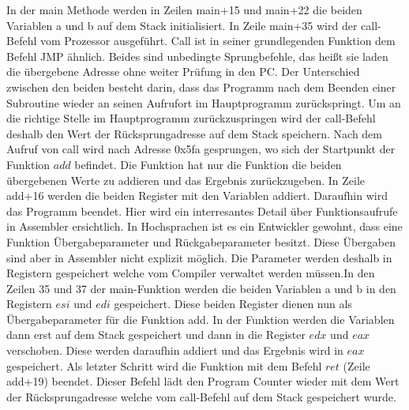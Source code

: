 \documentclass[12pt]{article}
\begin{document}
In der main Methode werden in Zeilen main+15 und main+22 die beiden Variablen a und b auf dem Stack initialisiert. In Zeile main+35 wird der call-Befehl vom Prozessor ausgeführt. Call ist in seiner grundlegenden Funktion dem Befehl JMP ähnlich. Beides sind unbedingte Sprungbefehle, das heißt sie laden die übergebene Adresse ohne weiter Prüfung in den PC. Der Unterschied zwischen den beiden besteht darin, dass das Programm nach dem Beenden einer Subroutine wieder an seinen Aufrufort im Hauptprogramm zurückspringt. Um an die richtige Stelle im Hauptprogramm zurückzuspringen wird der call-Befehl deshalb den Wert der Rücksprungadresse auf dem Stack speichern. Nach dem Aufruf von call wird nach Adresse 0x5fa gesprungen, wo sich der Startpunkt der Funktion $add$ befindet. Die Funktion hat nur die Funktion die beiden übergebenen Werte zu addieren und das Ergebnis zurückzugeben. In Zeile add+16 werden die beiden Register mit den Variablen addiert. Daraufhin wird das Programm beendet. Hier wird ein interresantes Detail über Funktionsaufrufe in Assembler ersichtlich. In Hochsprachen ist es ein Entwickler gewohnt, dass eine Funktion Übergabeparameter und Rückgabeparameter besitzt. Diese Übergaben sind aber in Assembler nicht explizit möglich. Die Parameter werden deshalb in Registern gespeichert welche vom Compiler verwaltet werden müssen.In den Zeilen 35 und 37 der main-Funktion werden die beiden Variablen a und b in den Registern $esi$ und $edi$ gespeichert. Diese beiden Register dienen nun als Übergabeparameter für die Funktion add. In der Funktion werden die Variablen dann erst auf dem Stack gespeichert und dann in die Register $edx$ und $eax$ verschoben. Diese werden daraufhin addiert und das Ergebnis wird in $eax$ gespeichert. Als letzter Schritt wird die Funktion mit dem Befehl $ret$ (Zeile add+19) beendet. Dieser Befehl lädt den Program Counter wieder mit dem Wert der Rücksprungadresse welche vom call-Befehl auf dem Stack gespeichert wurde.
\end{document}
